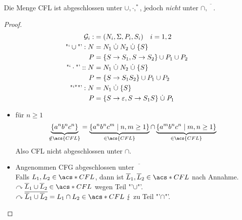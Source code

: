 \begin{Satz} %
  \label{thm:cfl-closed-reg-intersect}
	Die Menge \acs{CFL} ist abgeschlossen unter $\cup, \cdot, ^*$, jedoch \emph{nicht} unter $\cap, \overline{\phantom{A}}$.
\end{Satz}
\begin{proof}
	\begin{align*}
		\mathcal{G}_i :&= (N_i, \Sigma,P_i,S_i) \quad i=1,2\\
		\text{"`}\cup\text{"'}: N &= N_1\dotcup N_2\dotcup\{S\}\\
		P &= \{S\->S_1, S\->S_2 \} \cup P_1\cup P_2\\
		\text{"`}\cdot\text{"'}:: N &= N_1\dotcup N_2\dotcup\{S\}\\
		P &= \{ S\->S_1S_2 \} \cup P_1\cup P_2\\
		\text{"`}^*\text{"'}: N &= N_1 \dotcup \{S\}\\
		P &= \{ S\->\Eps, S\-> S_1S \} \dotcup P_1
	\end{align*}
	\begin{itemize}
	\item für $n\geq 1$
		\[ \underbrace{\{a^nb^nc^n\}}_{\notin \acs{CFL}} = \underbrace{\{a^nb^nc^m \mid n,m\geq 1 \}}_{\in \acs{CFL}} \cap \underbrace{\{a^mb^nc^n \mid m,n\geq 1 \}}_{\in \acs{CFL}} \]
		Also \ac{CFL} nicht abgeschlossen unter $\cap$.
	\item Angenommen \ac{CFG} abgeschlossen unter $\overline{\phantom{X}}$\\
		Falls $L_1,L_2\in \acs*{CFL}$, dann ist $\overline{L}_1,\overline{L}_2\in\acs*{CFL}$ nach Annahme.\\
		$\curvearrowright \overline{L}_1\cup \overline{L}_2\in\acs*{CFL}$ wegen Teil "'$\cup$"'.\\
		$\curvearrowright \overline{\overline{L}_1\cup \overline{L}_2} = L_1\cap L_2\in\acs*{CFL}\ \lightning$ zu Teil "'$\cap$"'. \qedhere
	\end{itemize}
\end{proof}

